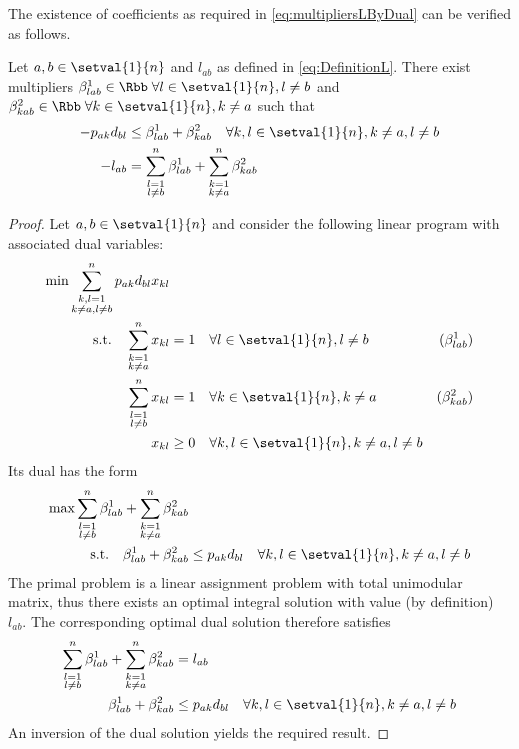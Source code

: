 The existence of coefficients as required in \eqref{eq:multipliersLByDual} can be verified as follows.
\begin{lemma}
	\label{lemma:ExistenceMultipliersLByDual}
	Let $a,b\in\setval{1}{n}$ and $l_{ab}$ as defined in \eqref{eq:DefinitionL}. There exist multipliers $\beta^1_{lab}\in\Rbb\;\forall l\in\setval{1}{n}, l\neq b$ and $\beta^2_{kab}\in\Rbb\;\forall k\in\setval{1}{n}, k\neq a$ such that
	\begin{align*}
		-p_{ak}d_{bl}&\leq \beta^1_{lab}+\beta^2_{kab}\quad\forall k,l\in\setval{1}{n}, k\neq a, l\neq b\\
		-l_{ab}&=\sum_{\substack{l=1\\l\neq b}}^n\beta^1_{lab} + \sum_{\substack{k=1\\k\neq a}}^n\beta^2_{kab}
	\end{align*}
\end{lemma}
\begin{proof}
	Let $a,b\in\setval{1}{n}$ and consider the following linear program with associated dual variables:
	\begin{align*}
		\min \sum_{\substack{k,l=1\\k\neq a, l\neq b}}^n p_{ak}d_{bl}x_{kl}&\\
		\text{s.t.}\quad\sum_{\substack{k=1\\k\neq a}}^nx_{kl}&=1\quad\forall l\in\setval{1}{n}, l\neq b &(\beta^1_{lab})\\
		\sum_{\substack{l=1\\l\neq b}}^nx_{kl}&=1\quad\forall k\in\setval{1}{n}, k\neq a &(\beta^2_{kab})\\
		x_{kl}&\geq 0\quad\forall k,l\in\setval{1}{n}, k\neq a, l\neq b
	\end{align*}
	Its dual has the form
	\begin{align*}
		\max \sum_{\substack{l=1\\l\neq b}}^n\beta^1_{lab} + \sum_{\substack{k=1\\k\neq a}}^n\beta^2_{kab} &\\
		\text{s.t.}\quad\beta^1_{lab} + \beta^2_{kab}&\leq p_{ak}d_{bl}\quad\forall k,l\in\setval{1}{n}, k\neq a, l\neq b
	\end{align*}
	The primal problem is a linear assignment problem with total unimodular matrix, thus there exists an optimal integral solution with value (by definition)~$l_{ab}$. The corresponding optimal dual solution therefore satisfies
	\begin{align*}
		\sum_{\substack{l=1\\l\neq b}}^n\beta^1_{lab} + \sum_{\substack{k=1\\k\neq a}}^n\beta^2_{kab}& = l_{ab}\\
		\quad\beta^1_{lab} + \beta^2_{kab}&\leq p_{ak}d_{bl}\quad\forall k,l\in\setval{1}{n}, k\neq a, l\neq b
	\end{align*}
	An inversion of the dual solution yields the required result.
\end{proof}

